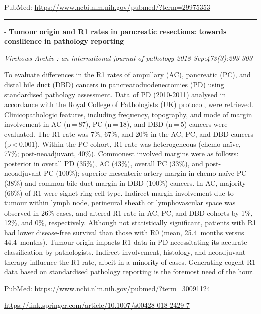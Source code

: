 \documentclass[]{article}
\begin{document}
PubMed: \url{https://www.ncbi.nlm.nih.gov/pubmed/?term=29975353}

{}

{}

\begin{center}\rule{0.5\linewidth}{\linethickness}\end{center}

 - \textbf{Tumour origin and R1 rates in pancreatic resections: towards
consilience in pathology reporting}

\emph{Virchows Archiv : an international journal of pathology 2018
Sep;473(3):293-303}

To evaluate differences in the R1 rates of ampullary (AC), pancreatic
(PC), and distal bile duct (DBD) cancers in pancreatoduodenectomies (PD)
using standardised pathology assessment. Data of PD (2010-2011) analysed
in accordance with the Royal College of Pathologists (UK) protocol, were
retrieved. Clinicopathologic features, including frequency, topography,
and mode of margin involvement in AC (n = 87), PC (n = 18), and DBD
(n = 5) cancers were evaluated. The R1 rate was 7\%, 67\%, and 20\% in
the AC, PC, and DBD cancers (p \textless{} 0.001). Within the PC cohort,
R1 rate was heterogeneous (chemo-naïve, 77\%; post-neoadjuvant, 40\%).
Commonest involved margins were as follows: posterior in overall PD
(35\%), AC (43\%), overall PC (33\%), and post-neoadjuvant PC (100\%);
superior mesenteric artery margin in chemo-naïve PC (38\%) and common
bile duct margin in DBD (100\%) cancers. In AC, majority (66\%) of R1
were signet ring cell type. Indirect margin involvement due to tumour
within lymph node, perineural sheath or lymphovascular space was
observed in 26\% cases, and altered R1 rate in AC, PC, and DBD cohorts
by 1\%, 12\%, and 0\%, respectively. Although not statistically
significant, patients with R1 had lower disease-free survival than those
with R0 (mean, 25.4~months versus 44.4~months). Tumour origin impacts R1
data in PD necessitating its accurate classification by pathologists.
Indirect involvement, histology, and neoadjuvant therapy influence the
R1 rate, albeit in a minority of cases. Generating cogent R1 data based
on standardised pathology reporting is the foremost need of the hour.

PubMed: \url{https://www.ncbi.nlm.nih.gov/pubmed/?term=30091124}

\url{https://link.springer.com/article/10.1007/s00428-018-2429-7}

{}

{}
\end{document}
